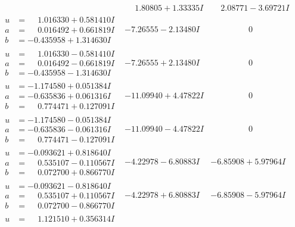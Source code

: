 \documentclass[1p]{elsarticle_modified}
\theoremstyle{definition}
\begin{document}
$$\begin{array}{c|c|c}
 & \phantom{-}1.80805 + 1.33335 I & \phantom{-}2.08771 - 3.69721 I \\ \hline\begin{aligned}
u &= \phantom{-}1.016330 + 0.581410 I \\
a &= \phantom{-}0.016492 + 0.661819 I \\
b &= -0.435958 + 1.314630 I\end{aligned}
 & -7.26555 - 2.13480 I & \phantom{-0.000000 } 0 \\ \hline\begin{aligned}
u &= \phantom{-}1.016330 - 0.581410 I \\
a &= \phantom{-}0.016492 - 0.661819 I \\
b &= -0.435958 - 1.314630 I\end{aligned}
 & -7.26555 + 2.13480 I & \phantom{-0.000000 } 0 \\ \hline\begin{aligned}
u &= -1.174580 + 0.051384 I \\
a &= -0.635836 + 0.061316 I \\
b &= \phantom{-}0.774471 + 0.127091 I\end{aligned}
 & -11.09940 + 4.47822 I & \phantom{-0.000000 } 0 \\ \hline\begin{aligned}
u &= -1.174580 - 0.051384 I \\
a &= -0.635836 - 0.061316 I \\
b &= \phantom{-}0.774471 - 0.127091 I\end{aligned}
 & -11.09940 - 4.47822 I & \phantom{-0.000000 } 0 \\ \hline\begin{aligned}
u &= -0.093621 + 0.818640 I \\
a &= \phantom{-}0.535107 - 0.110567 I \\
b &= \phantom{-}0.072700 + 0.866770 I\end{aligned}
 & -4.22978 - 6.80883 I & -6.85908 + 5.97964 I \\ \hline\begin{aligned}
u &= -0.093621 - 0.818640 I \\
a &= \phantom{-}0.535107 + 0.110567 I \\
b &= \phantom{-}0.072700 - 0.866770 I\end{aligned}
 & -4.22978 + 6.80883 I & -6.85908 - 5.97964 I \\ \hline\begin{aligned}
u &= \phantom{-}1.121510 + 0.356314 I \\

\end{aligned}
\end{array}$$
\end{document}
